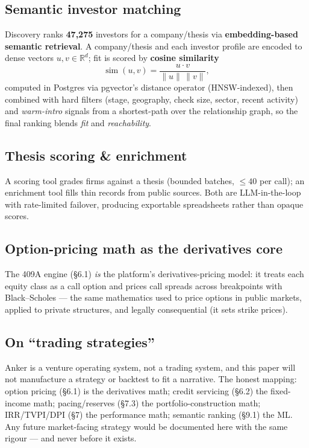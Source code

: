 \documentclass[11pt]{article}
\begin{document}
\subsection{Semantic investor matching}
Discovery ranks \textbf{47{,}275} investors for a company/thesis via
\textbf{embedding-based semantic retrieval}. A company/thesis and each investor
profile are encoded to dense vectors $u,v\in\mathbb{R}^d$; fit is scored by
\textbf{cosine similarity}
\begin{equation}
\operatorname{sim}(u,v) = \frac{u\cdot v}{\lVert u\rVert\,\lVert v\rVert},
\end{equation}
computed in Postgres via pgvector's distance operator (HNSW-indexed), then combined
with hard filters (stage, geography, check size, sector, recent activity) and
\emph{warm-intro} signals from a shortest-path over the relationship graph, so the
final ranking blends \emph{fit} and \emph{reachability}.

\subsection{Thesis scoring \& enrichment}
A scoring tool grades firms against a thesis (bounded batches, $\le 40$ per call);
an enrichment tool fills thin records from public sources. Both are LLM-in-the-loop
with rate-limited failover, producing exportable spreadsheets rather than opaque
scores.

\subsection{Option-pricing math as the derivatives core}
The 409A engine (\S6.1) \emph{is} the platform's derivatives-pricing model: it
treats each equity class as a call option and prices call spreads across
breakpoints with Black--Scholes --- the same mathematics used to price options in
public markets, applied to private structures, and legally consequential (it sets
strike prices).

\subsection{On ``trading strategies''}
Anker is a venture operating system, not a trading system, and this paper will not
manufacture a strategy or backtest to fit a narrative. The honest mapping: option
pricing (\S6.1) is the derivatives math; credit servicing (\S6.2) the fixed-income
math; pacing/reserves (\S7.3) the portfolio-construction math; IRR/TVPI/DPI (\S7)
the performance math; semantic ranking (\S9.1) the ML. Any future market-facing
strategy would be documented here with the same rigour --- and never before it
exists.
\end{document}
